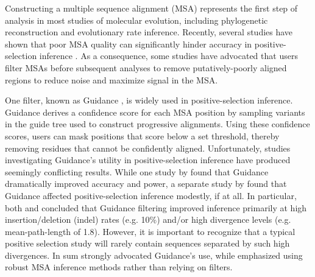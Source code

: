 \documentclass[11pt]{article}
\begin{document}
Constructing a multiple sequence alignment (MSA) represents the first step of analysis in most studies of molecular evolution, including phylogenetic reconstruction and evolutionary rate inference. Recently, several studies have shown that poor MSA quality can significantly hinder accuracy in positive-selection inference  \citep{Schneider2009, Fletcher2010, MarkovaRaina2011}. As a consequence, some studies have advocated that users filter MSAs before subsequent analyses to remove putatively-poorly aligned regions \citep{Jordan2012,Privman2012} to reduce noise and maximize signal in the MSA.

One filter, known as Guidance \citep{Penn2010}, is widely used in positive-selection inference. Guidance derives a confidence score for each MSA position by sampling variants in the guide tree used to construct progressive alignments. Using these confidence scores, users can mask positions that score below a set threshold, thereby removing residues that cannot be confidently aligned. Unfortunately, studies investigating Guidance's utility in positive-selection inference have produced seemingly conflicting results. While one study by \citet{Privman2012} found that Guidance dramatically improved accuracy and power, a separate study by \citet{Jordan2012} found that Guidance affected positive-selection inference modestly, if at all. In particular, both \citet{Privman2012} and \citet{Jordan2012} concluded that Guidance filtering improved inference primarily at high insertion/deletion (indel) rates (e.g. 10\%) and/or high divergence levels (e.g. mean-path-length of 1.8). However, it is important to recognize that a typical positive selection study will rarely contain sequences separated by such high divergences.
In sum \citet{Privman2012} strongly advocated Guidance's use, while \citet{Jordan2012} emphasized using robust MSA inference methods rather than relying on filters. 
\end{document}

